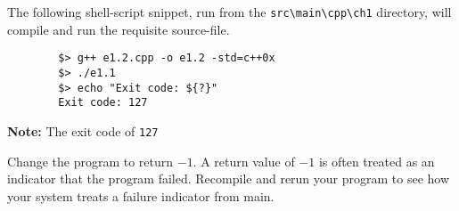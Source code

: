 \documentclass[12pt, a4paper]{article}
\begin{document}
    \noindent The following shell-script snippet, run from the \texttt{src\textbackslash main\textbackslash cpp\textbackslash ch1} directory, will compile and run the requisite source-file.
    \begin{verbatim}
        $> g++ e1.2.cpp -o e1.2 -std=c++0x
        $> ./e1.1
        $> echo "Exit code: ${?}"
        Exit code: 127
    \end{verbatim}

    \noindent\textbf{Note:} The exit code of \texttt{127}

    \bigskip
    \begin{tcolorbox}[title={Exercise: 1.2}]
        Change the program to return $-1$.
        A return value of $-1$ is often treated as an indicator that the program failed.
        Recompile and rerun your program to see how your system treats a failure indicator from main.
    \end{tcolorbox}

    \pagebreak
    \printbibliography
\end{document}
